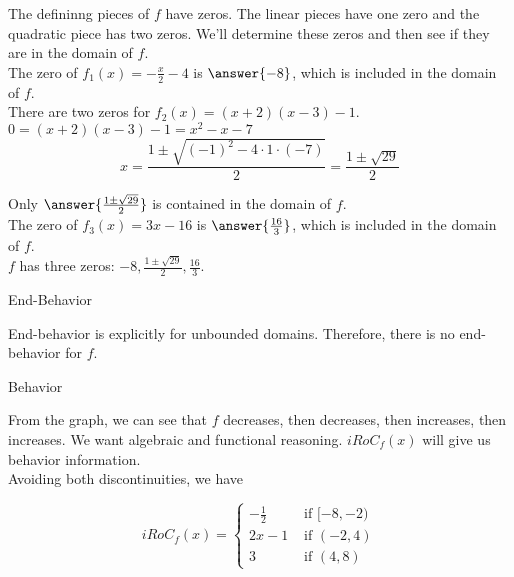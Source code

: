 \documentclass{ximera}
\begin{document}
\begin{exercise}
\begin{question}
The defininng pieces of $f$ have zeros.  The linear pieces have one zero and the quadratic piece has two zeros.  We'll determine these zeros and then see if they are in the domain of $f$. \\



The zero of $f_1(x) = -\frac{x}{2} - 4$ is $\answer{-8}$, which is included in the domain of $f$. \\

There are two zeros for $f_2(x) = (x+2)(x-3) - 1$. \\


$ 0 = (x+2)(x-3) - 1 = x^2 - x - 7$ \\

\[
x = \frac{1 \pm \sqrt{(-1)^2 - 4 \cdot 1 \cdot (-7)}}{2} = \frac{1 \pm \sqrt{29}}{2}
\]


Only $\answer{\frac{1 \pm \sqrt{29}}{2}}$ is contained in the domain of $f$. \\


The zero of $f_3(x) = 3x-16$ is $\answer{\frac{16}{3}}$, which is included in the domain of $f$. \\




$f$ has three zeros:  $-8, \frac{1 \pm \sqrt{29}}{2}, \frac{16}{3}$.


\end{question}





\begin{question} End-Behavior



End-behavior is explicitly for unbounded domains.  Therefore, there is no end-behavior for $f$.


\end{question}






\begin{question} Behavior



From the graph, we can see that $f$ decreases, then decreases, then increases, then increases.  We want algebraic and functional reasoning. $iRoC_f(x)$ will give us behavior information.   \\


Avoiding both discontinuities, we have

\[
iRoC_f(x) = 
\begin{cases}
  -\frac{1}{2}   & \text{ if } [-8, -2)   \\
  2x - 1      & \text{ if } (-2, 4)  \\
  3             & \text{ if } (4,8)
\end{cases}
\]



\end{question}
\end{exercise}
\end{document}
